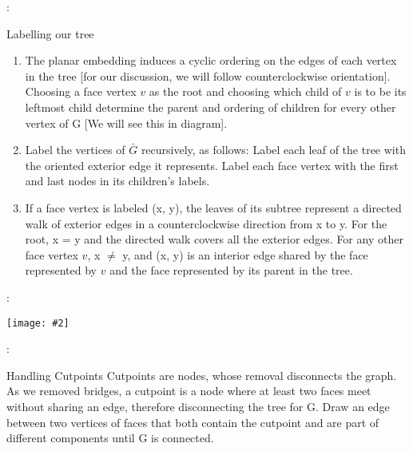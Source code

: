 \documentclass{beamer}
\newcommand{\iph}[2]{
    \texttt{[image: \#2]}
}
\begin{document}
\begin{framefont}{\small}
\begin{frame}{\secname : \subsecname}
    \begin{block}{Labelling our tree}
        \begin{enumerate}
        \item The planar embedding induces a cyclic ordering on the
        edges of each vertex in the tree [for our discussion, we will follow counterclockwise orientation]. Choosing a face vertex $v$ as the root and
        choosing which child of $v$ is to be its leftmost child determine the parent and
        ordering of children for every other vertex of G [We will see this in diagram].
        \item Label the vertices of $\bar{G}$ recursively, as follows: Label each leaf of the tree
        with the oriented exterior edge it represents. Label each face vertex with the
        first and last nodes in its children’s labels.
        \item If a face vertex is labeled (x, y), the leaves of its subtree represent a directed
        walk of exterior edges in a counterclockwise direction from x to y. For the
        root, x = y and the directed walk covers all the exterior edges. For any other
        face vertex $v$, x $\neq$ y, and (x, y) is an interior edge shared by the face
        represented by $v$ and the face represented by its parent in the tree.
        \end{enumerate}
    \end{block}

\end{frame}
\end{framefont}


\begin{frame}{\secname : \subsecname}
    \iph{0.9}{lin2}

\end{frame}

\begin{frame}{\secname : \subsecname}
    \begin{block}{Handling Cutpoints}
        Cutpoints are nodes,
whose removal disconnects the graph. As we removed bridges, a cutpoint
is a node where at least two faces meet without
sharing an edge, therefore disconnecting the tree for
G. Draw an edge between two vertices of faces that
both contain the cutpoint and are part of different
components until G is connected.
    \end{block}
\end{frame}
\end{document}
